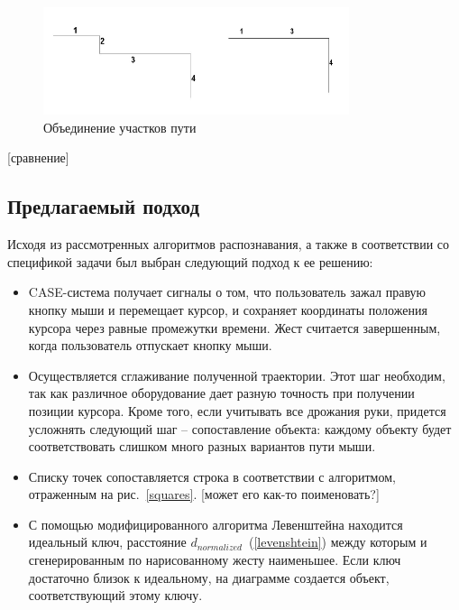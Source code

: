 \documentclass[a5paper]{article}
\begin{document}
\begin{figure} [ht]
  \begin{center}
    \includegraphics[width=0.8\textwidth, bb=0 0 500 200]{04-qt.png}
    \caption{Объединение участков пути}
    \label{qt}
  \end{center}
\end{figure}

[сравнение]

\subsection{Предлагаемый подход}

Исходя из рассмотренных алгоритмов распознавания, а также в соответствии со спецификой задачи был выбран следующий подход к ее решению:

\begin{itemize}
  \item CASE-система получает сигналы о том, что пользователь зажал правую кнопку мыши и перемещает курсор, и сохраняет координаты положения курсора
через равные промежутки времени. Жест считается завершенным, когда пользователь отпускает кнопку мыши.
  \item Осуществляется сглаживание полученной траектории. Этот шаг необходим, так как различное оборудование дает разную точность при получении 
позиции курсора. Кроме того, если учитывать все дрожания руки, придется усложнять следующий шаг -- сопоставление объекта: каждому объекту
будет соответствовать слишком много разных вариантов пути мыши.
  \item Списку точек сопоставляется строка в соответствии с алгоритмом, отраженным на рис.~\ref{squares}. [может его как-то поименовать?]
  \item С помощью модифицированного алгоритма Левенштейна находится идеальный ключ, расстояние $d_{normalized}$~(\ref{levenshtein}) между которым и 
сгенерированным по нарисованному жесту наименьшее. Если ключ достаточно близок к идеальному, на диаграмме создается объект, соответствующий этому ключу.
\end{itemize}
\end{document}
